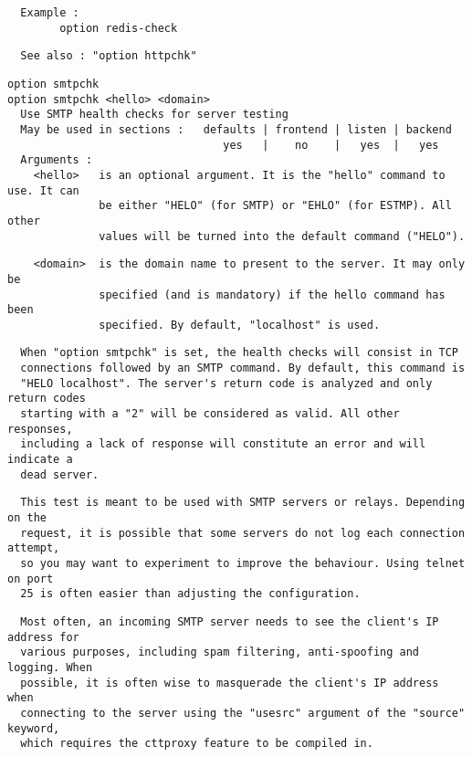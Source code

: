 \begin{verbatim}
  Example :
        option redis-check
\end{verbatim}

\begin{verbatim}
  See also : "option httpchk"
\end{verbatim}

\begin{verbatim}
option smtpchk
option smtpchk <hello> <domain>
  Use SMTP health checks for server testing
  May be used in sections :   defaults | frontend | listen | backend
                                 yes   |    no    |   yes  |   yes
  Arguments :
    <hello>   is an optional argument. It is the "hello" command to use. It can
              be either "HELO" (for SMTP) or "EHLO" (for ESTMP). All other
              values will be turned into the default command ("HELO").
\end{verbatim}

\begin{verbatim}
    <domain>  is the domain name to present to the server. It may only be
              specified (and is mandatory) if the hello command has been
              specified. By default, "localhost" is used.
\end{verbatim}

\begin{verbatim}
  When "option smtpchk" is set, the health checks will consist in TCP
  connections followed by an SMTP command. By default, this command is
  "HELO localhost". The server's return code is analyzed and only return codes
  starting with a "2" will be considered as valid. All other responses,
  including a lack of response will constitute an error and will indicate a
  dead server.
\end{verbatim}

\begin{verbatim}
  This test is meant to be used with SMTP servers or relays. Depending on the
  request, it is possible that some servers do not log each connection attempt,
  so you may want to experiment to improve the behaviour. Using telnet on port
  25 is often easier than adjusting the configuration.
\end{verbatim}

\begin{verbatim}
  Most often, an incoming SMTP server needs to see the client's IP address for
  various purposes, including spam filtering, anti-spoofing and logging. When
  possible, it is often wise to masquerade the client's IP address when
  connecting to the server using the "usesrc" argument of the "source" keyword,
  which requires the cttproxy feature to be compiled in.
\end{verbatim}

